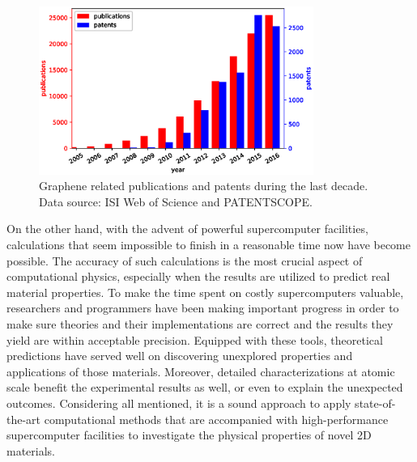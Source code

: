 \begin{figure}[htbp!] 
\centering  
\includegraphics[width=0.8\textwidth]{graphene_papers.eps}
\caption[Graphene related publications and patents during the last decade]{Graphene related publications and patents during the last decade. Data source: ISI Web of Science and PATENTSCOPE. \protect\footnotemark }
\label{fig:grpapers}
\end{figure} 

On the other hand, with the advent of powerful supercomputer facilities, calculations that seem impossible to finish in a reasonable time now have become possible. The accuracy of such calculations is the most crucial aspect of computational physics, especially when the results are utilized to predict real material properties. To make the time spent on costly supercomputers valuable, researchers and programmers have been making important progress in order to make sure theories and their implementations are correct and the results they yield are within acceptable precision. Equipped with these tools, theoretical predictions have served well on discovering unexplored properties and applications of those materials. Moreover, detailed characterizations at atomic scale benefit the experimental results as well, or even to explain the unexpected outcomes. Considering all mentioned, it is a sound approach to apply state-of-the-art computational methods that are accompanied with high-performance supercomputer facilities to investigate the physical properties of novel 2D materials. 


